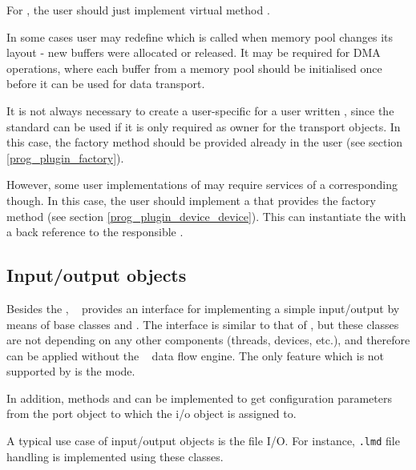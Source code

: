 For , the user should just 
implement virtual method  .  

In some cases user may redefine  which is called when
memory pool changes its layout - new buffers were allocated or released. 
It may be required for DMA operations, where each buffer from a memory pool
should be initialised once before it can be used for data transport.   

It is not always necessary to create a user-specific  for a user written , since the standard 
can be used if it is only required as owner for the transport objects.
In this case, the factory method  
should be provided  already in the user  (see section \ref{prog_plugin_factory}). 

However, some user implementations of  may require
services of a corresponding  though. In this
case, the user should implement a  that
provides the factory method  (see section \ref{prog_plugin_device_device}). This can instantiate the
 with a back reference to the responsible . 



\subsection{Input/output objects}
Besides the ,
\dabc~ provides an interface for implementing
a simple input/output by means of base classes
 and .
The interface is similar to that of ,
but these classes are not depending on 
any other components (threads, devices, etc.), 
and therefore can be applied without the  \dabc~ data flow engine.
The only feature which is not supported by  is the  
mode.

In addition, methods  and
 can be implemented to get 
configuration parameters from the port object to which the i/o object is assigned to.  

A typical use case of input/output objects is the file I/O. 
For instance, {\tt\*.lmd} file handling is implemented
using these classes.

